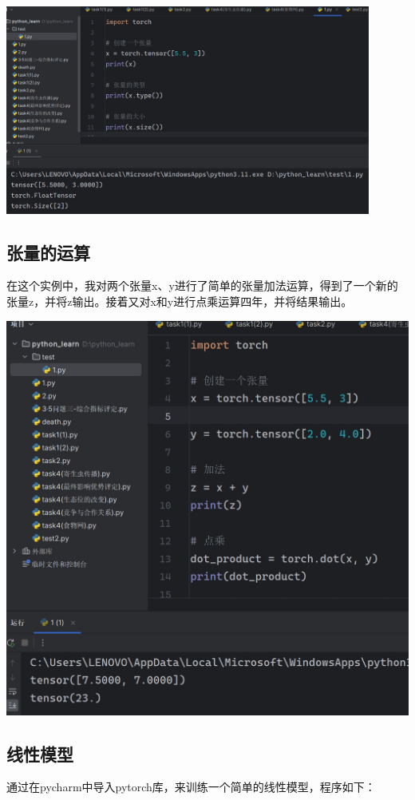 \documentclass[UTF8,a4paper]{ctexart}
\begin{document}
\begin{sloppypar}
	\includegraphics[width = 12cm]{38}
	
	\subsection{张量的运算}
	在这个实例中，我对两个张量x、y进行了简单的张量加法运算，得到了一个新的张量z，并将z输出。接着又对x和y进行点乘运算四年，并将结果输出。
	
	\includegraphics[width = 16cm]{45}
	
	\subsection{线性模型}
	通过在pycharm中导入pytorch库，来训练一个简单的线性模型，程序如下：
	

\end{sloppypar}
\end{document}
